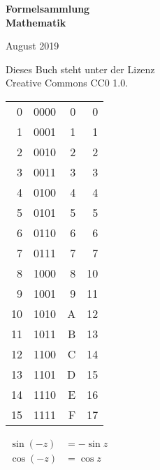 \documentclass[a4paper,10pt,fleqn,twocolumn,twoside,openany]{scrbook}
\numberwithin{equation}{chapter}
\newenvironment{ttsection}{\ttfamily}{\par}
\theoremstyle{Definition}
\theoremstyle{SatzBox}
\begin{document}
\setlength{\abovedisplayskip}{6pt}
\setlength{\belowdisplayskip}{6pt}
\setlength{\abovedisplayshortskip}{6pt}
\setlength{\belowdisplayshortskip}{6pt}
\setlength{\abovecaptionskip}{2pt plus 2pt minus 1pt}

\begin{titlepage}
\centering
\phantom{x}

\vspace{20em}
{\noindent\Huge\sffamily\textbf{Formelsammlung\\
Mathematik}\par}

\vspace{2em}
{\Large August 2019}\\
\end{titlepage}

\thispagestyle{empty}

\noindent
Dieses Buch steht unter der Lizenz\\
Creative Commons CC0 1.0.
\vspace{8em}

\noindent
\begin{ttsection}
\begin{tabular}{r|r|r|r}
 0 & 0000 & 0 &  0\\
 1 & 0001 & 1 &  1\\
 2 & 0010 & 2 &  2\\
 3 & 0011 & 3 &  3\\
\noalign{\vspace{1em}}
 4 & 0100 & 4 &  4\\
 5 & 0101 & 5 &  5\\
 6 & 0110 & 6 &  6\\
 7 & 0111 & 7 &  7\\
\noalign{\vspace{1em}}
 8 & 1000 & 8 & 10\\
 9 & 1001 & 9 & 11\\
10 & 1010 & A & 12\\
11 & 1011 & B & 13\\
\noalign{\vspace{1em}}
12 & 1100 & C & 14\\
13 & 1101 & D & 15\\
14 & 1110 & E & 16\\
15 & 1111 & F & 17
\end{tabular}
\end{ttsection}

\newpage
\noindent
$\!\begin{aligned}
\sin(-z) &= -\sin z\\
\cos(-z) &= \cos z
\end{aligned}$
\vspace{1em}
\end{document}
